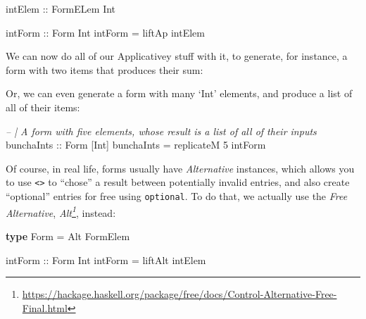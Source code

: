 \documentclass[]{article}
\newenvironment{Shaded}{}{}
\newcommand{\CommentTok}[1]{\textcolor[rgb]{0.38,0.63,0.69}{\textit{#1}}}
\newcommand{\DataTypeTok}[1]{\textcolor[rgb]{0.56,0.13,0.00}{#1}}
\newcommand{\DecValTok}[1]{\textcolor[rgb]{0.25,0.63,0.44}{#1}}
\newcommand{\FunctionTok}[1]{\textcolor[rgb]{0.02,0.16,0.49}{#1}}
\newcommand{\KeywordTok}[1]{\textcolor[rgb]{0.00,0.44,0.13}{\textbf{#1}}}
\newcommand{\NormalTok}[1]{#1}
\newcommand{\OtherTok}[1]{\textcolor[rgb]{0.00,0.44,0.13}{#1}}
\renewcommand{\href}[2]{#2\footnote{\url{#1}}}
\begin{document}
\begin{Shaded}
\begin{Highlighting}[]
\OtherTok{intElem ::} \DataTypeTok{FormELem} \DataTypeTok{Int}

\OtherTok{intForm ::} \DataTypeTok{Form} \DataTypeTok{Int}
\NormalTok{intForm }\FunctionTok{=}\NormalTok{ liftAp intElem}
\end{Highlighting}
\end{Shaded}

We can now do all of our Applicativey stuff with it, to generate, for instance,
a form with two items that produces their sum:

\begin{Shaded}
\end{Shaded}

Or, we can even generate a form with many `Int' elements, and produce a list of
all of their items:

\begin{Shaded}
\begin{Highlighting}[]
\CommentTok{-- | A form with five elements, whose result is a list of all of their inputs}
\OtherTok{bunchaInts ::} \DataTypeTok{Form}\NormalTok{ [}\DataTypeTok{Int}\NormalTok{]}
\NormalTok{bunchaInts }\FunctionTok{=}\NormalTok{ replicateM }\DecValTok{5}\NormalTok{ intForm}
\end{Highlighting}
\end{Shaded}

Of course, in real life, forms usually have \emph{Alternative} instances, which
allows you to use \texttt{\textless{}\textbar{}\textgreater{}} to ``chose'' a
result between potentially invalid entries, and also create ``optional'' entries
for free using \texttt{optional}. To do that, we actually use the \emph{Free
Alternative},
\emph{\href{https://hackage.haskell.org/package/free/docs/Control-Alternative-Free-Final.html}{Alt}},
instead:

\begin{Shaded}
\begin{Highlighting}[]
\KeywordTok{type} \DataTypeTok{Form} \FunctionTok{=} \DataTypeTok{Alt} \DataTypeTok{FormElem}

\OtherTok{intForm ::} \DataTypeTok{Form} \DataTypeTok{Int}
\NormalTok{intForm }\FunctionTok{=}\NormalTok{ liftAlt intElem}
\end{Highlighting}
\end{Shaded}
\end{document}
